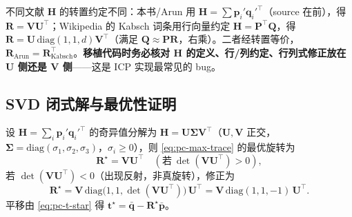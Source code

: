 \begin{note}
不同文献 $\mathbf{H}$ 的转置约定不同：本书/Arun 用 $\mathbf{H}=\sum\mathbf{p}_i'\mathbf{q}_i'^\top$（source 在前），得 $\mathbf{R}=\mathbf{V}\mathbf{U}^\top$；Wikipedia 的 Kabsch 词条用行向量约定 $\mathbf{H}=\mathbf{P}^\top\mathbf{Q}$，得 $\mathbf{R}=\mathbf{U}\,\mathrm{diag}(1,1,d)\mathbf{V}^\top$（满足 $\mathbf{Q}\approx\mathbf{P}\mathbf{R}$，右乘）。二者经转置等价，$\mathbf{R}_{\text{Arun}}=\mathbf{R}_{\text{Kabsch}}^\top$。\textbf{移植代码时务必核对 $\mathbf{H}$ 的定义、行/列约定、行列式修正放在 $\mathbf{U}$ 侧还是 $\mathbf{V}$ 侧}——这是 ICP 实现最常见的 bug。
\end{note}

\subsection{SVD 闭式解与最优性证明}
\label{sec:pc-icp-svd}

\begin{theorem}\label{thm:pc-svd}
设 $\mathbf{H}=\sum_i\mathbf{p}_i'\mathbf{q}_i'^\top$ 的奇异值分解为 $\mathbf{H}=\mathbf{U}\boldsymbol{\Sigma}\mathbf{V}^\top$（$\mathbf{U},\mathbf{V}$ 正交，$\boldsymbol{\Sigma}=\mathrm{diag}(\sigma_1,\sigma_2,\sigma_3)$，$\sigma_i\ge0$），则 \cref{eq:pc-max-trace} 的最优旋转为
\begin{equation}
  \mathbf{R}^\star=\mathbf{V}\mathbf{U}^\top\quad(\text{若}\ \det(\mathbf{V}\mathbf{U}^\top)>0),
  \label{eq:pc-R-svd}
\end{equation}
若 $\det(\mathbf{V}\mathbf{U}^\top)<0$（出现反射，非真旋转），修正为
\begin{equation}
  \mathbf{R}^\star=\mathbf{V}\,\mathrm{diag}\!\big(1,1,\det(\mathbf{V}\mathbf{U}^\top)\big)\,\mathbf{U}^\top
  =\mathbf{V}\,\mathrm{diag}(1,1,-1)\,\mathbf{U}^\top.
  \label{eq:pc-R-svd-fix}
\end{equation}
平移由 \cref{eq:pc-t-star} 得 $\mathbf{t}^\star=\bar{\mathbf{q}}-\mathbf{R}^\star\bar{\mathbf{p}}$。
\end{theorem}

